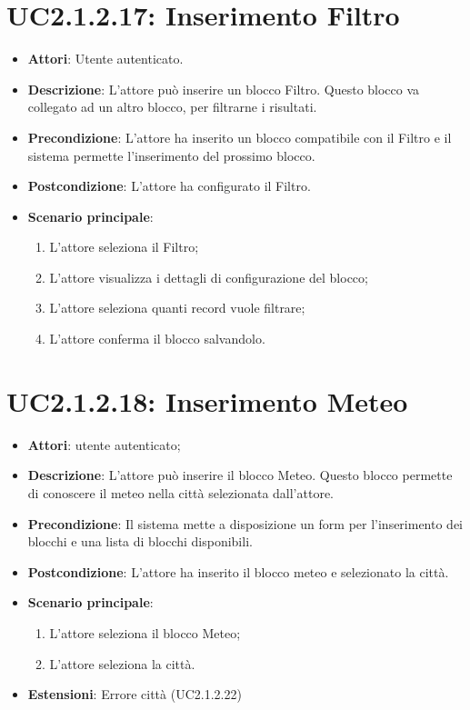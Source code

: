 \section{UC2.1.2.17: Inserimento Filtro}
\label{UC2.1.2.17}
\begin{itemize}
	\item \textbf{Attori}: Utente autenticato.
	\item \textbf{Descrizione}: L'attore può inserire un blocco Filtro. Questo blocco va collegato ad un altro blocco, per filtrarne i risultati. 
	\item \textbf{Precondizione}: L'attore ha inserito un blocco compatibile con il Filtro e il sistema permette l'inserimento del prossimo blocco.
	\item \textbf{Postcondizione}: L'attore ha configurato il Filtro. 
	\item \textbf{Scenario principale}:
	\begin{enumerate} \item L'attore seleziona il Filtro; \item L'attore visualizza i dettagli di configurazione del blocco; \item  L'attore seleziona quanti record vuole filtrare; \item L'attore conferma il blocco salvandolo.\end{enumerate}
\end{itemize}

\section{UC2.1.2.18: Inserimento Meteo}
\label{UC2.1.2.18}
\begin{itemize}
	\item \textbf{Attori}: utente autenticato;
	\item \textbf{Descrizione}: L'attore può inserire il blocco Meteo. Questo blocco permette di conoscere il meteo nella città selezionata dall'attore.
	\item \textbf{Precondizione}: Il sistema mette a disposizione un form per l'inserimento dei blocchi e una lista di blocchi disponibili.	
	\item \textbf{Postcondizione}: L'attore ha inserito il blocco meteo e selezionato la città.
	\item \textbf{Scenario principale}:
	\begin{enumerate} \item L'attore seleziona il blocco Meteo;  \item  L'attore seleziona la città.\end{enumerate}
	\item \textbf{Estensioni}:
	Errore città (UC2.1.2.22)
\end{itemize}

